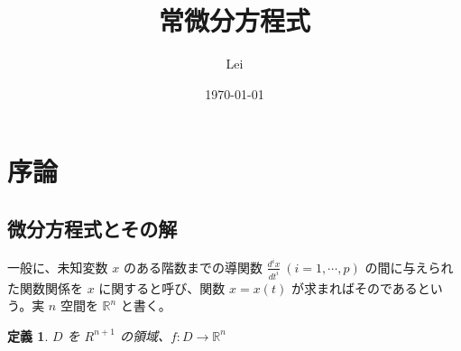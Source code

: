 \documentclass[dvipdfmx, a4paper]{jsarticle}
\title{常微分方程式}
\author{Lei}
\date{\today}
\newcommand{\R}{\mathbb{R}}
\newtheorem{definition}[theorem]{定義}
\begin{document}
\maketitle

\section{序論}

\subsection{微分方程式とその解}

一般に、未知変数 $x$ のある階数までの導関数 $\frac{d^ix}{dt^i}\ (i=1, \cdots, p)$ の間に与えられた関数関係を $x$ に関すると呼び、関数 $x=x(t)$ が求まればそのであるという。実 $n$ 空間を $\R^n$ と書く。

\begin{definition}
    $D$ を $R^{n+1}$ の領域、$f: D\to \R^n$
\end{definition}
\end{document}
